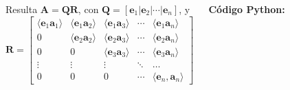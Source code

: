 \documentclass[9pt, aspectratio=169]{beamer}
\begin{document}
\begin{frame}[fragile]
\begin{columns}[t]
    Resulta $\bm{A} = \bm{Q} \bm{R}$, con $\bm{Q} = [\bm{e}_1 | \bm{e}_2 | \cdots | \bm{e}_n]$, y 
    \[ \bm{R} = 
        \begin{bmatrix} \langle \bm{e}_1 \bm{a}_1 \rangle & \langle \bm{e}_1 \bm{a}_2 \rangle & \langle \bm{e}_1 \bm{a}_3 \rangle & \cdots & \langle \bm{e}_1 \bm{a}_n \rangle \\
       0  & \langle \bm{e}_2 \bm{a}_2 \rangle & \langle \bm{e}_2 \bm{a}_3 \rangle & \cdots & \langle \bm{e}_2 \bm{a}_n \rangle \\
       0  & 0 & \langle \bm{e}_3 \bm{a}_3 \rangle & \cdots & \langle \bm{e}_3 \bm{a}_n \rangle \\
       \vdots & \vdots & \vdots & \ddots & \ldots \\
   0 & 0 & 0 & \cdots & \langle \bm{e}_n, \bm{a}_n \rangle \end{bmatrix} \] \pause

\vspace{1em}
\textbf{Código Python:}


\end{columns}
\end{frame}
\end{document}
